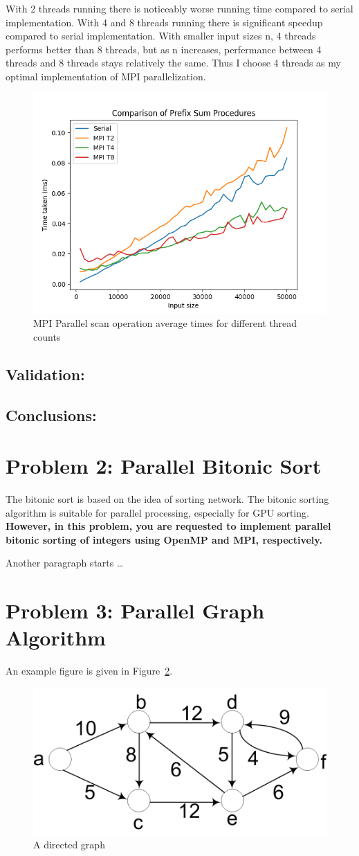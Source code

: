 	With 2 threads running there is noticeably worse running time compared to serial implementation. With 4 and 8 threads running there is significant speedup compared to serial implementation. With smaller input sizes n, 4 threads performs better than 8 threads, but as n increases, perfermance between 4 threads and 8 threads stays relatively the same. Thus I choose 4 threads as my optimal implementation of MPI parallelization.
	\begin{figure}[!htb]
		\centering
		\includegraphics[width=0.6\linewidth]{scan_mpi_comparison.png}
		\caption{MPI Parallel scan operation average times for different thread counts}
		\label{fig:fig_scan_mpi_comparison}
	\end{figure}

	\subsection{Validation:}

	\subsection{Conclusions:}


	\newpage
	\section{Problem 2: Parallel Bitonic Sort}
	The bitonic sort is based on the idea of sorting network. The bitonic sorting algorithm is suitable for parallel processing, especially for GPU sorting. \textbf{However, in this problem, you are requested to implement parallel bitonic sorting of integers using \textbf{OpenMP and MPI}, respectively. }
	
	Another paragraph starts \dots
	\section{Problem 3: Parallel Graph Algorithm}
	An example figure is given in Figure~\ref{fig:sp_fig1}.
	\begin{figure}[!htb]
		\centering
		\includegraphics[width=0.5\linewidth]{sp_fig1.png}
		\caption{A directed graph}\label{fig:sp_fig1}
	\end{figure}
	
